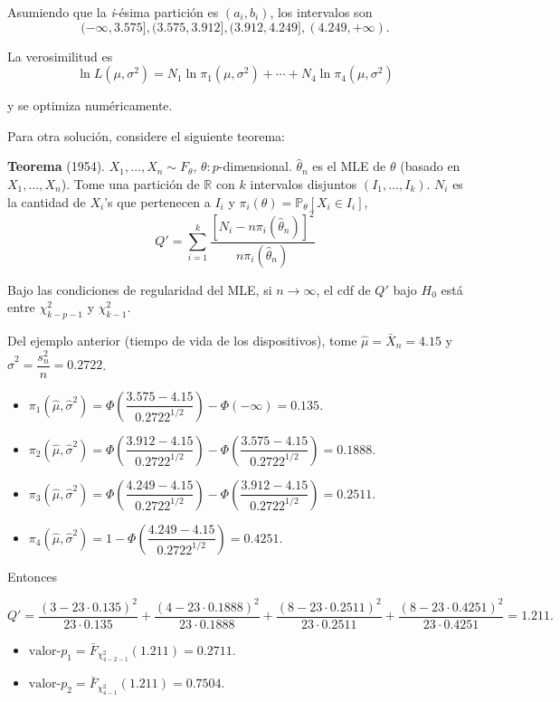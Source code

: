 \documentclass[
  12pt,
]{book}
\begin{document}
Asumiendo que la \emph{i}-ésima partición es \((a_i,b_i)\), los intervalos son
\[(-\infty,3.575],(3.575,3.912],(3.912,4.249], (4.249,+\infty).\]

La verosimilitud es
\[\ln L(\mu,\sigma^2) = N_1\ln \pi_1(\mu,\sigma^2)+\cdots+N_4\ln\pi_4(\mu,\sigma^2)\]

y se optimiza numéricamente.

Para otra solución, considere el siguiente teorema:

\textbf{Teorema} (1954). \(X_1,\dots, X_n\sim F_\theta\), \(\theta: p\)-dimensional. \(\hat\theta_n\) es el MLE de \(\theta\) (basado en \(X_1,\dots, X_n\)). Tome una partición de \(\mathbb R\) con \(k\) intervalos disjuntos \((I_1,\dots,I_k)\). \(N_i\) es la cantidad de \(X_i\)'s que pertenecen a \(I_i\) y \(\pi_i(\theta)=\mathbb P_\theta[X_i\in I_i]\),
\[Q' = \sum_{i=1}^k\dfrac{[N_i-n\pi_i(\hat\theta_n)]^2}{n\pi_i(\hat\theta_n)}\]

Bajo las condiciones de regularidad del MLE, si \(n\to\infty\), el cdf de \(Q'\) bajo \(H_0\) está entre \(\chi^2_{k-p-1}\) y \(\chi^2_{k-1}\).

Del ejemplo anterior (tiempo de vida de los dispositivos), tome \(\hat\mu = \bar X_n = 4.15\) y \(\hat\sigma^2 = \dfrac{s_n^2}{n} = 0.2722\).

\begin{itemize}
\item
  \(\pi_1(\hat\mu,\hat\sigma^2) = \Phi\left(\dfrac{3.575-4.15}{0.2722^{1/2}}\right)-\Phi(-\infty) = 0.135\).
\item
  \(\pi_2(\hat\mu,\hat\sigma^2) = \Phi\left(\dfrac{3.912-4.15}{0.2722^{1/2}}\right) - \Phi\left(\dfrac{3.575-4.15}{0.2722^{1/2}}\right) = 0.1888\).
\item
  \(\pi_3(\hat\mu,\hat\sigma^2) = \Phi\left(\dfrac{4.249-4.15}{0.2722^{1/2}}\right) - \Phi\left(\dfrac{3.912-4.15}{0.2722^{1/2}}\right) = 0.2511\).
\item
  \(\pi_4(\hat\mu,\hat\sigma^2) = 1 - \Phi\left(\dfrac{4.249-4.15}{0.2722^{1/2}}\right) = 0.4251\).
\end{itemize}

Entonces

\[Q' = \dfrac{(3-23\cdot 0.135)^2}{23\cdot 0.135} + \dfrac{(4-23\cdot 0.1888)^2}{23\cdot 0.1888} + \dfrac{(8-23\cdot 0.2511)^2}{23\cdot 0.2511} +\dfrac{(8-23\cdot 0.4251)^2}{23\cdot 0.4251}  = 1.211.\]

\begin{itemize}
\item
  \(\text{valor-}p_1 = \bar F_{\chi^2_{4-2-1}}(1.211) = 0.2711\).
\item
  \(\text{valor-}p_2 = \bar F_{\chi^2_{4-1}}(1.211) = 0.7504\).
\end{itemize}
\end{document}
